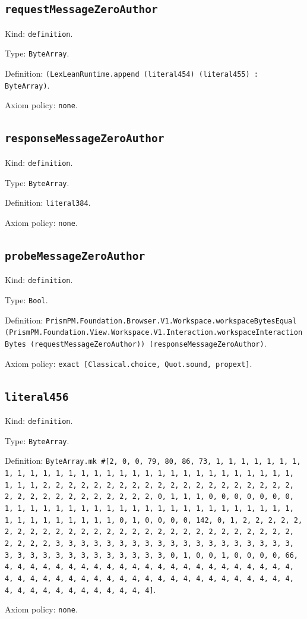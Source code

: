 \documentclass[11pt]{article}
\begin{document}
\subsection*{\texttt{requestMessageZeroAuthor}}
\noindent Kind: \texttt{definition}.\par
\noindent Type: \texttt{ByteArray}.\par
\noindent Definition: \texttt{(LexLeanRuntime.append (literal454) (literal455) : ByteArray)}.\par
\noindent Axiom policy: \texttt{none}.\par
\subsection*{\texttt{responseMessageZeroAuthor}}
\noindent Kind: \texttt{definition}.\par
\noindent Type: \texttt{ByteArray}.\par
\noindent Definition: \texttt{literal384}.\par
\noindent Axiom policy: \texttt{none}.\par
\subsection*{\texttt{probeMessageZeroAuthor}}
\noindent Kind: \texttt{definition}.\par
\noindent Type: \texttt{Bool}.\par
\noindent Definition: \texttt{PrismPM.Foundation.Browser.V1.Workspace.workspaceBytesEqual (PrismPM.Foundation.View.Workspace.V1.Interaction.workspaceInteractionBytes (requestMessageZeroAuthor)) (responseMessageZeroAuthor)}.\par
\noindent Axiom policy: \texttt{exact [Classical.choice, Quot.sound, propext]}.\par
\subsection*{\texttt{literal456}}
\noindent Kind: \texttt{definition}.\par
\noindent Type: \texttt{ByteArray}.\par
\noindent Definition: \texttt{ByteArray.mk \#[2, 0, 0, 79, 80, 86, 73, 1, 1, 1, 1, 1, 1, 1, 1, 1, 1, 1, 1, 1, 1, 1, 1, 1, 1, 1, 1, 1, 1, 1, 1, 1, 1, 1, 1, 1, 1, 1, 1, 1, 2, 2, 2, 2, 2, 2, 2, 2, 2, 2, 2, 2, 2, 2, 2, 2, 2, 2, 2, 2, 2, 2, 2, 2, 2, 2, 2, 2, 2, 2, 2, 2, 0, 1, 1, 1, 0, 0, 0, 0, 0, 0, 0, 1, 1, 1, 1, 1, 1, 1, 1, 1, 1, 1, 1, 1, 1, 1, 1, 1, 1, 1, 1, 1, 1, 1, 1, 1, 1, 1, 1, 1, 1, 1, 1, 0, 1, 0, 0, 0, 0, 142, 0, 1, 2, 2, 2, 2, 2, 2, 2, 2, 2, 2, 2, 2, 2, 2, 2, 2, 2, 2, 2, 2, 2, 2, 2, 2, 2, 2, 2, 2, 2, 2, 2, 2, 3, 3, 3, 3, 3, 3, 3, 3, 3, 3, 3, 3, 3, 3, 3, 3, 3, 3, 3, 3, 3, 3, 3, 3, 3, 3, 3, 3, 3, 3, 3, 3, 0, 1, 0, 0, 1, 0, 0, 0, 0, 66, 4, 4, 4, 4, 4, 4, 4, 4, 4, 4, 4, 4, 4, 4, 4, 4, 4, 4, 4, 4, 4, 4, 4, 4, 4, 4, 4, 4, 4, 4, 4, 4, 4, 4, 4, 4, 4, 4, 4, 4, 4, 4, 4, 4, 4, 4, 4, 4, 4, 4, 4, 4, 4, 4, 4, 4, 4, 4]}.\par
\noindent Axiom policy: \texttt{none}.\par
\end{document}
